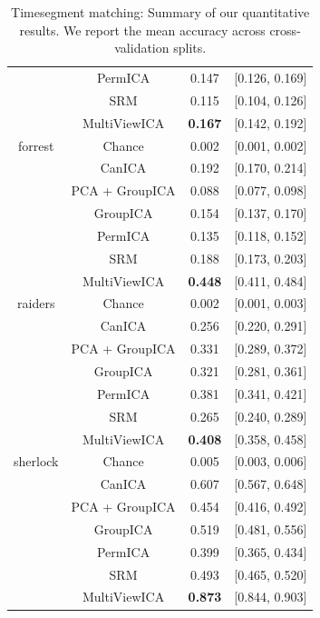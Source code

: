 \documentclass{report}
\begin{document}
{\begin{table}
\begin{tabular}{|c|c | c | c|}
        & PermICA     & 0.147&[0.126, 0.169] \\
        & SRM         & 0.115&[0.104, 0.126] \\
        & MultiViewICA& \textbf{0.167}&[0.142, 0.192] \\
        \hline
forrest & Chance      & 0.002&[0.001, 0.002] \\
        & CanICA    & 0.192&[0.170, 0.214] \\
        & PCA + GroupICA      & 0.088&[0.077, 0.098] \\
        & GroupICA    & 0.154&[0.137, 0.170] \\
        & PermICA     & 0.135&[0.118, 0.152] \\
        & SRM         & 0.188&[0.173, 0.203] \\
        & MultiViewICA& \textbf{0.448}&[0.411, 0.484] \\
        \hline
raiders & Chance      & 0.002&[0.001, 0.003] \\
        & CanICA    & 0.256&[0.220, 0.291] \\
        & PCA + GroupICA      & 0.331&[0.289, 0.372] \\
        & GroupICA    & 0.321&[0.281, 0.361] \\
        & PermICA     & 0.381&[0.341, 0.421] \\
        & SRM         & 0.265&[0.240, 0.289] \\
         & MultiViewICA& \textbf{0.408}&[0.358, 0.458] \\
         \hline
sherlock& Chance      & 0.005&[0.003, 0.006] \\
        & CanICA    & 0.607&[0.567, 0.648] \\
        & PCA + GroupICA      & 0.454&[0.416, 0.492] \\
        & GroupICA    & 0.519&[0.481, 0.556] \\
        & PermICA     & 0.399&[0.365, 0.434] \\
        & SRM         & 0.493&[0.465, 0.520] \\
        & MultiViewICA& \textbf{0.873}&[0.844, 0.903] \\
\hline
    \end{tabular}
    \caption{Timesegment matching: Summary of our quantitative results. We report the mean accuracy across cross-validation splits.}
    \label{tab:timeseg}
\end{table}

}
\end{document}

